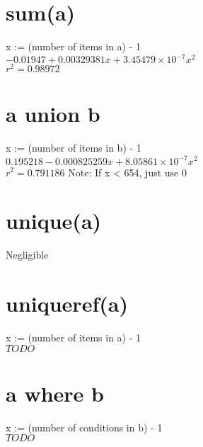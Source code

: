 \documentclass[12pt]{article}
\begin{document}
	\section{sum(a)}
	x := (number of items in a) - 1\\
	$-0.01947 + 0.00329381 x + 3.45479 \times 10^{-7} x^2$\\
	$r^2 = 0.98972$
	
	\section{a union b}
	x := (number of items in b) - 1\\
	$0.195218 - 0.000825259 x + 8.05861 \times 10^{-7} x^2$\\
	$r^2 = 0.791186$
	Note: If x < 654, just use 0
	
	\section{unique(a)}
	Negligible
	
	\section{uniqueref(a)}
	x := (number of items in a) - 1\\
	$TODO$
	
	\section{a where b}
	x := (number of conditions in b) - 1\\
	$TODO$
\end{document}
